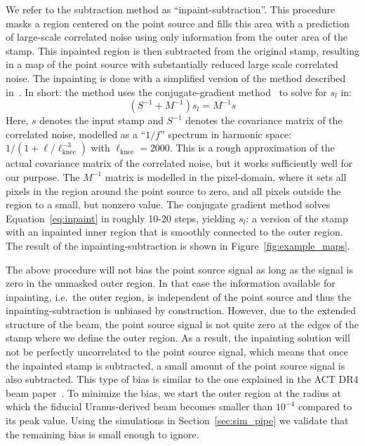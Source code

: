 We refer to the subtraction method as ``inpaint-subtraction''. This procedure masks a region centered on the point source and fills this area with a prediction of large-scale correlated noise using only information from the outer area of the stamp. This inpainted region is then subtracted from the original stamp, resulting in a map of the point source with substantially reduced large scale correlated noise. The inpainting is done with a simplified version of the method described in~\cite{bucher_2012}. In short: the method uses the conjugate-gradient method~\cite{Shewchuk_1994} to solve for $s_l$ in:
\begin{equation}\label{eq:inpaint}
\left(S^{-1} + M^{-1} \right) s_l = M^{-1} s
\end{equation}
Here, $s$ denotes the input stamp and $S^{-1}$ denotes the covariance matrix of the correlated noise, modelled as a ``$1/f$'' spectrum in harmonic space: $1/ (1 + \ell / \ell_{\mathrm{knee}}^{-3})$ with $\ell_{\mathrm{knee}} = 2000$. This is a rough approximation of the actual covariance matrix of the correlated noise, but it works sufficiently well for our purpose. The $M^{-1}$ matrix is modelled in the pixel-domain, where it sets all pixels in the region around the point source to zero, and all pixels outside the region to a small, but nonzero value. The conjugate gradient method solves Equation~\ref{eq:inpaint} in roughly 10-20 steps, yielding $s_l$: a version of the stamp with an inpainted inner region that is smoothly connected to the outer region. The result of the inpainting-subtraction is shown in Figure~\ref{fig:example_maps}.

The above procedure will not bias the point source signal as long as the signal is zero in the unmasked outer region. In that case the information available for inpainting, i.e.\ the outer region, is independent of the point source and thus the inpainting-subtraction is unbiased by construction. However, due to the extended structure of the beam, the point source signal is not quite zero at the edges of the stamp where we define the outer region. As a result, the inpainting solution will not be perfectly uncorrelated to the point source signal, which means that once the inpainted stamp is subtracted, a small amount of the point source signal is also subtracted. This type of bias is similar to the one explained in the ACT DR4 beam paper~\cite{Lungu_2022}. To minimize the bias, we start the outer region at the radius at which the fiducial Uranus-derived beam becomes smaller than $10^{-4}$ compared to its peak value. Using the simulations in Section~\ref{sec:sim_pipe} we validate that the remaining bias is small enough to ignore.
 
